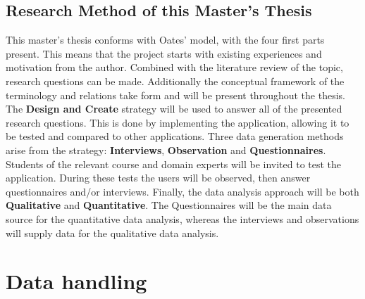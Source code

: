     \SPACE
    
    \subsection*{Research Method of this Master's Thesis}
    This master's thesis conforms with Oates' model, with the four first parts present. This means that the project starts with existing experiences and motivation from the author. Combined with the literature review of the topic, research questions can be made. Additionally the conceptual framework of the terminology and relations take form and will be present throughout the thesis. The \textbf{Design and Create} strategy will be used to answer all of the presented research questions. This is done by implementing the application, allowing it to be tested and compared to other applications. Three data generation methods arise from the strategy: \textbf{Interviews}, \textbf{Observation} and \textbf{Questionnaires}. Students of the relevant course and domain experts will be invited to test the application. During these tests the users will be observed, then answer questionnaires and/or interviews. Finally, the data analysis approach will be both \textbf{Qualitative} and \textbf{Quantitative}. The Questionnaires will be the main data source for the quantitative data analysis, whereas the interviews and observations will supply data for the qualitative data analysis.

\section{Data handling}
